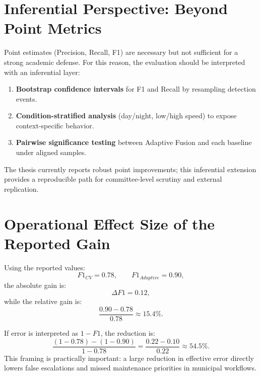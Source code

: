 \section{Inferential Perspective: Beyond Point Metrics}
Point estimates (Precision, Recall, F1) are necessary but not sufficient for a strong academic defense. For this reason, the evaluation should be interpreted with an inferential layer:
\begin{enumerate}
    \item \textbf{Bootstrap confidence intervals} for F1 and Recall by resampling detection events.
    \item \textbf{Condition-stratified analysis} (day/night, low/high speed) to expose context-specific behavior.
    \item \textbf{Pairwise significance testing} between Adaptive Fusion and each baseline under aligned samples.
\end{enumerate}

The thesis currently reports robust point improvements; this inferential extension provides a reproducible path for committee-level scrutiny and external replication.

\section{Operational Effect Size of the Reported Gain}
Using the reported values:
\begin{equation}
F1_{CV}=0.78, \qquad F1_{Adaptive}=0.90,
\end{equation}
the absolute gain is:
\begin{equation}
\Delta F1 = 0.12,
\end{equation}
while the relative gain is:
\begin{equation}
\frac{0.90-0.78}{0.78} \approx 15.4\%.
\end{equation}

If error is interpreted as $1-F1$, the reduction is:
\begin{equation}
\frac{(1-0.78)-(1-0.90)}{1-0.78}=\frac{0.22-0.10}{0.22} \approx 54.5\%.
\end{equation}
This framing is practically important: a large reduction in effective error directly lowers false escalations and missed maintenance priorities in municipal workflows.

